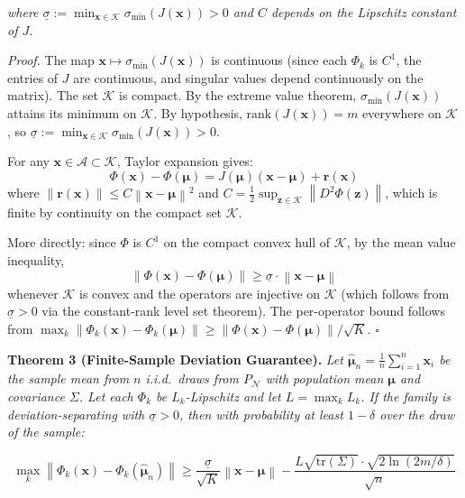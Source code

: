 \documentclass[journal]{IEEEtran}
\newcommand{\norm}[1]{\left\lVert#1\right\rVert}
\begin{document}
\textit{where $\underline{\sigma} := \min_{\mathbf{x} \in \mathcal{K}} \sigma_{\min}(J(\mathbf{x})) > 0$ and $C$ depends on the Lipschitz constant of $J$.}

\textit{Proof.} The map $\mathbf{x} \mapsto \sigma_{\min}(J(\mathbf{x}))$ is continuous (since each $\Phi_k$ is $C^1$, the entries of $J$ are continuous, and singular values depend continuously on the matrix). The set $\mathcal{K}$ is compact. By the extreme value theorem, $\sigma_{\min}(J(\mathbf{x}))$ attains its minimum on $\mathcal{K}$. By hypothesis, $\text{rank}(J(\mathbf{x})) = m$ everywhere on $\mathcal{K}$, so $\underline{\sigma} := \min_{\mathbf{x} \in \mathcal{K}} \sigma_{\min}(J(\mathbf{x})) > 0$.

For any $\mathbf{x} \in \mathcal{A} \subset \mathcal{K}$, Taylor expansion gives:
$$\Phi(\mathbf{x}) - \Phi(\boldsymbol{\mu}) = J(\boldsymbol{\mu})(\mathbf{x} - \boldsymbol{\mu}) + \mathbf{r}(\mathbf{x})$$
where $\norm{\mathbf{r}(\mathbf{x})} \leq C \norm{\mathbf{x} - \boldsymbol{\mu}}^2$ and $C = \frac{1}{2}\sup_{\mathbf{z} \in \mathcal{K}} \norm{D^2 \Phi(\mathbf{z})}$, which is finite by continuity on the compact set $\mathcal{K}$.

More directly: since $\Phi$ is $C^1$ on the compact convex hull of $\mathcal{K}$, by the mean value inequality,
$$\norm{\Phi(\mathbf{x}) - \Phi(\boldsymbol{\mu})} \geq \underline{\sigma} \cdot \norm{\mathbf{x} - \boldsymbol{\mu}}$$
whenever $\mathcal{K}$ is convex and the operators are injective on $\mathcal{K}$ (which follows from $\underline{\sigma} > 0$ via the constant-rank level set theorem). The per-operator bound follows from $\max_k \norm{\Phi_k(\mathbf{x}) - \Phi_k(\boldsymbol{\mu})} \geq \norm{\Phi(\mathbf{x}) - \Phi(\boldsymbol{\mu})}/\sqrt{K}$. $\square$

\vspace{0.5em}

\textbf{Theorem 3 (Finite-Sample Deviation Guarantee).} \textit{Let $\hat{\boldsymbol{\mu}}_n = \frac{1}{n}\sum_{i=1}^n \mathbf{x}_i$ be the sample mean from $n$ i.i.d.\ draws from $P_{\mathcal{N}}$ with population mean $\boldsymbol{\mu}$ and covariance $\Sigma$. Let each $\Phi_k$ be $L_k$-Lipschitz and let $L = \max_k L_k$. If the family is deviation-separating with $\underline{\sigma} > 0$, then with probability at least $1 - \delta$ over the draw of the sample:}

\begin{equation}
\max_{k} \norm{\Phi_k(\mathbf{x}) - \Phi_k(\hat{\boldsymbol{\mu}}_n)} \geq \frac{\underline{\sigma}}{\sqrt{K}} \norm{\mathbf{x} - \boldsymbol{\mu}} - \frac{L \sqrt{\text{tr}(\Sigma)} \cdot \sqrt{2 \ln(2m/\delta)}}{\sqrt{n}}
\label{eq:finite_sample}
\end{equation}
\end{document}
